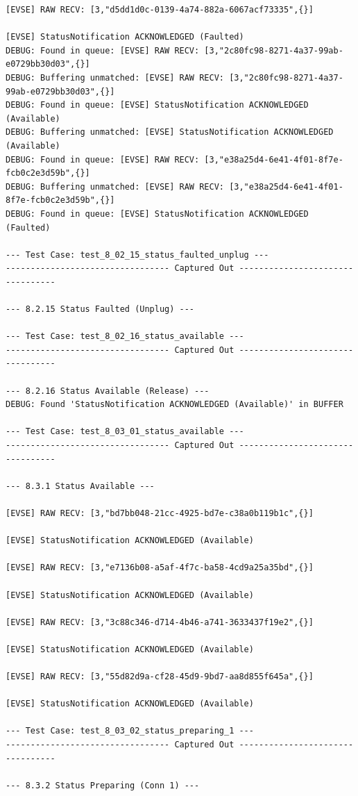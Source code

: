 \documentclass{article}
\begin{document}
\begin{lstlisting}
[EVSE] RAW RECV: [3,"d5dd1d0c-0139-4a74-882a-6067acf73335",{}]

[EVSE] StatusNotification ACKNOWLEDGED (Faulted)
DEBUG: Found in queue: [EVSE] RAW RECV: [3,"2c80fc98-8271-4a37-99ab-e0729bb30d03",{}]
DEBUG: Buffering unmatched: [EVSE] RAW RECV: [3,"2c80fc98-8271-4a37-99ab-e0729bb30d03",{}]
DEBUG: Found in queue: [EVSE] StatusNotification ACKNOWLEDGED (Available)
DEBUG: Buffering unmatched: [EVSE] StatusNotification ACKNOWLEDGED (Available)
DEBUG: Found in queue: [EVSE] RAW RECV: [3,"e38a25d4-6e41-4f01-8f7e-fcb0c2e3d59b",{}]
DEBUG: Buffering unmatched: [EVSE] RAW RECV: [3,"e38a25d4-6e41-4f01-8f7e-fcb0c2e3d59b",{}]
DEBUG: Found in queue: [EVSE] StatusNotification ACKNOWLEDGED (Faulted)

--- Test Case: test_8_02_15_status_faulted_unplug ---
--------------------------------- Captured Out ---------------------------------

--- 8.2.15 Status Faulted (Unplug) ---

--- Test Case: test_8_02_16_status_available ---
--------------------------------- Captured Out ---------------------------------

--- 8.2.16 Status Available (Release) ---
DEBUG: Found 'StatusNotification ACKNOWLEDGED (Available)' in BUFFER

--- Test Case: test_8_03_01_status_available ---
--------------------------------- Captured Out ---------------------------------

--- 8.3.1 Status Available ---

[EVSE] RAW RECV: [3,"bd7bb048-21cc-4925-bd7e-c38a0b119b1c",{}]

[EVSE] StatusNotification ACKNOWLEDGED (Available)

[EVSE] RAW RECV: [3,"e7136b08-a5af-4f7c-ba58-4cd9a25a35bd",{}]

[EVSE] StatusNotification ACKNOWLEDGED (Available)

[EVSE] RAW RECV: [3,"3c88c346-d714-4b46-a741-3633437f19e2",{}]

[EVSE] StatusNotification ACKNOWLEDGED (Available)

[EVSE] RAW RECV: [3,"55d82d9a-cf28-45d9-9bd7-aa8d855f645a",{}]

[EVSE] StatusNotification ACKNOWLEDGED (Available)

--- Test Case: test_8_03_02_status_preparing_1 ---
--------------------------------- Captured Out ---------------------------------

--- 8.3.2 Status Preparing (Conn 1) ---


\end{lstlisting}
\end{document}
